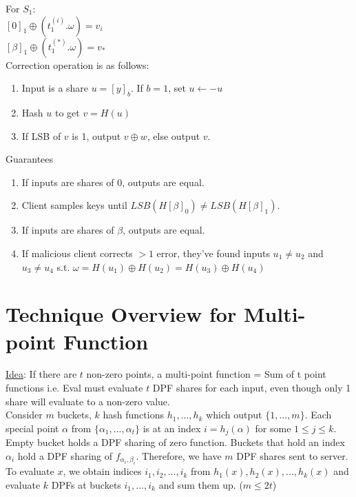 For $S_1$: \\
$[0]_1 \oplus (t_1^{(i)}.\omega) = v_i$ \\
$[\beta]_1 \oplus (t_1^{(*)}.\omega) = v_*$ \\

Correction operation is as follows:
\begin{enumerate}
    \item Input is a share $u = [y]_b$. If $b = 1$, set $u \leftarrow -u$
    \item Hash $u$ to get $v = H(u)$
    \item If LSB of $v$ is 1, output $v \oplus w$, else output $v$.
\end{enumerate}

Guarantees
\begin{enumerate}
    \item If inputs are shares of 0, outputs are equal.
    \item Client samples keys until $LSB(H[\beta]_0) \neq LSB(H[\beta]_1)$.
    \item If inputs are shares of $\beta$, outputs are equal.
    \item If malicious client corrects $> 1$ error, they've found inputs $u_1 \neq u_2$ and $u_3 \neq u_4$ s.t. $\omega = H(u_1) \oplus H(u_2) = H(u_3) \oplus H(u_4)$
\end{enumerate}

\section{Technique Overview for Multi-point Function}
\underline{Idea}: If there are $t$ non-zero points, a multi-point function = Sum of t point functions i.e. Eval must evaluate $t$ DPF shares for each input, even though only 1 share will evaluate to a non-zero value.\\

Consider $m$ buckets, $k$ hash functions $h_1, ..., h_k$ which output $\{1, ..., m\}$. Each special point $\alpha$ from $\{\alpha_1, ..., \alpha_t\}$ is at an index $i = h_j(\alpha)$ for some $1 \leq j \leq k$.\\

Empty bucket holds a DPF sharing of zero function. Buckets that hold an index $\alpha_i$ hold a DPF sharing of $f_{\alpha_i, \beta_i}$. Therefore, we have $m$ DPF shares sent to server.\\

To evaluate $x$, we obtain indices $i_1, i_2, ..., i_k$ from $h_1(x), h_2(x), ..., h_k(x)$ and evaluate $k$ DPFs at buckets $i_1, ..., i_k$ and sum them up. ($m \leq 2t$)
%
